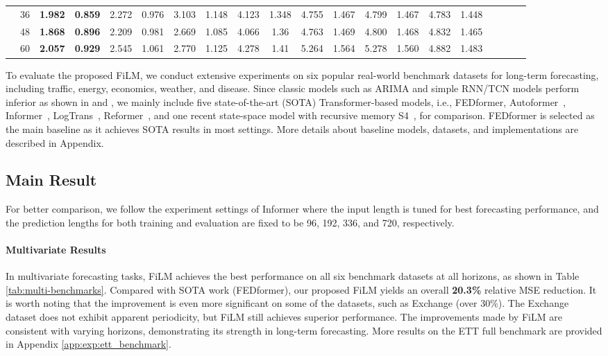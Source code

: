 \documentclass{article}
\begin{document}
\begin{table*}[h]
{\begin{tabular}{c|c|cccccccccccccccccc}
                        & 36 & \textbf{1.982} & \textbf{0.859} &2.272  &0.976  &3.103  &1.148 &4.123 &1.348 &4.755  &1.467  &4.799  &1.467  &4.783  &1.448    \\
                        & 48 & \textbf{1.868} & \textbf{0.896} &2.209  &0.981  &2.669  &1.085 &4.066 &1.36 &4.763  &1.469  &4.800  &1.468  &4.832  &1.465    \\
                        & 60 & \textbf{2.057} & \textbf{0.929} &2.545  &1.061  &2.770  &1.125 &4.278 &1.41 &5.264  &1.564  &5.278  &1.560  &4.882  &1.483    \\
\bottomrule
\end{tabular}
\label{tab:multi-benchmarks}
}
\end{table*}
%
 
To evaluate the proposed FiLM, we conduct extensive experiments on six popular real-world benchmark datasets for long-term forecasting, including traffic, energy, economics, weather, and disease. 
Since classic models such as ARIMA and simple RNN/TCN models perform inferior as shown in \cite{haoyietal-informer-2021} and \cite{Autoformer}, we mainly include five state-of-the-art (SOTA) Transformer-based models, i.e., FEDformer, Autoformer~\cite{Autoformer}, Informer~\cite{haoyietal-informer-2021}, LogTrans~\cite{Log-transformer-shiyang-2019}, Reformer~\cite{DBLP:conf/iclr/KitaevKL20-reformer}, and one recent state-space model with recursive memory S4~\cite{S4}, for comparison. FEDformer is selected as the main baseline as it achieves SOTA results in most settings. More details about baseline models, datasets, and implementations are described in Appendix. 

\subsection{Main Result}
For better comparison, we follow the experiment settings of Informer \cite{haoyietal-informer-2021} where the input length is tuned for best forecasting performance, and the prediction lengths for both training and evaluation are fixed to be 96, 192, 336, and 720, respectively.

\paragraph{Multivariate Results}
In multivariate forecasting tasks,
FiLM achieves the best performance on all six benchmark datasets at all horizons, as shown in Table \ref{tab:multi-benchmarks}. Compared with SOTA work (FEDformer), our proposed FiLM yields an overall \textbf{20.3\%} relative MSE reduction. It is worth noting that the improvement is even more significant on some of the datasets, such as Exchange (over 30\%). The Exchange dataset does not exhibit apparent periodicity, but FiLM still achieves superior performance.  
The improvements made by FiLM are consistent with varying horizons, demonstrating
its strength in long-term forecasting. More results
on the ETT full benchmark are provided in Appendix \ref{app:exp:ett_benchmark}.
\end{document}
